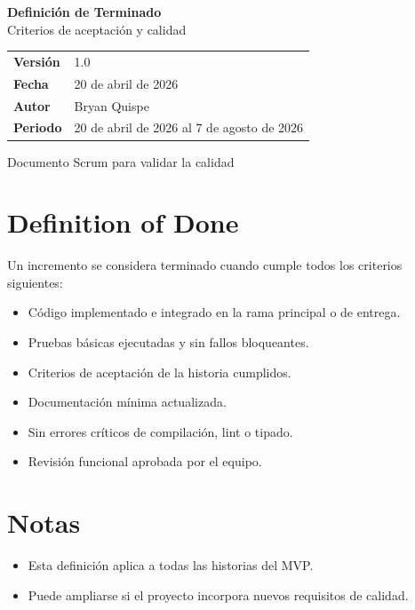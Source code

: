 \documentclass[12pt,a4paper]{article}
\title{\Huge\textbf{Definición de Terminado}\[0.3em]\Large Plataforma Web de Mascotas 3D}
\author{Bryan Quispe}
\date{20 de abril de 2026}
\begin{document}
\begin{titlepage}
\centering
\vspace*{1.8cm}
{\Huge\bfseries\color{PrimaryBlue} Definición de Terminado\\[0.35em]}
{\LARGE Criterios de aceptación y calidad\\[1.2cm]}

\begin{tabular}{p{5cm} p{8cm}}
\rowcolor{SoftGray}
\textbf{Versión} & 1.0 \\
\textbf{Fecha} & 20 de abril de 2026 \\
\textbf{Autor} & Bryan Quispe \\
\textbf{Periodo} & 20 de abril de 2026 al 7 de agosto de 2026 \\
\end{tabular}

\vfill
{\large Documento Scrum para validar la calidad}
\end{titlepage}

\section{Definition of Done}
Un incremento se considera terminado cuando cumple todos los criterios siguientes:
\begin{itemize}[leftmargin=*]
    \item Código implementado e integrado en la rama principal o de entrega.
    \item Pruebas básicas ejecutadas y sin fallos bloqueantes.
    \item Criterios de aceptación de la historia cumplidos.
    \item Documentación mínima actualizada.
    \item Sin errores críticos de compilación, lint o tipado.
    \item Revisión funcional aprobada por el equipo.
\end{itemize}

\section{Notas}
\begin{itemize}[leftmargin=*]
    \item Esta definición aplica a todas las historias del MVP.
    \item Puede ampliarse si el proyecto incorpora nuevos requisitos de calidad.
\end{itemize}
\end{document}
